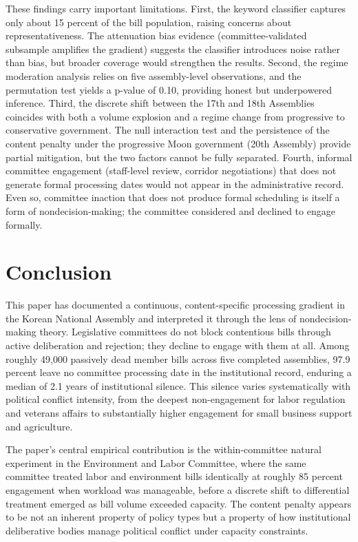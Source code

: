 \documentclass[11pt]{article}
\begin{document}
These findings carry important limitations. First, the keyword classifier captures only about 15 percent of the bill population, raising concerns about representativeness. The attenuation bias evidence (committee-validated subsample amplifies the gradient) suggests the classifier introduces noise rather than bias, but broader coverage would strengthen the results. Second, the regime moderation analysis relies on five assembly-level observations, and the permutation test yields a p-value of 0.10, providing honest but underpowered inference. Third, the discrete shift between the 17th and 18th Assemblies coincides with both a volume explosion and a regime change from progressive to conservative government. The null interaction test and the persistence of the content penalty under the progressive Moon government (20th Assembly) provide partial mitigation, but the two factors cannot be fully separated. Fourth, informal committee engagement (staff-level review, corridor negotiations) that does not generate formal processing dates would not appear in the administrative record. Even so, committee inaction that does not produce formal scheduling is itself a form of nondecision-making; the committee considered and declined to engage formally.


\section{Conclusion}
\label{sec:conclusion}

This paper has documented a continuous, content-specific processing gradient in the Korean National Assembly and interpreted it through the lens of nondecision-making theory. Legislative committees do not block contentious bills through active deliberation and rejection; they decline to engage with them at all. Among roughly 49,000 passively dead member bills across five completed assemblies, 97.9 percent leave no committee processing date in the institutional record, enduring a median of 2.1 years of institutional silence. This silence varies systematically with political conflict intensity, from the deepest non-engagement for labor regulation and veterans affairs to substantially higher engagement for small business support and agriculture.

The paper's central empirical contribution is the within-committee natural experiment in the Environment and Labor Committee, where the same committee treated labor and environment bills identically at roughly 85 percent engagement when workload was manageable, before a discrete shift to differential treatment emerged as bill volume exceeded capacity. The content penalty appears to be not an inherent property of policy types but a property of how institutional deliberative bodies manage political conflict under capacity constraints.
\end{document}
